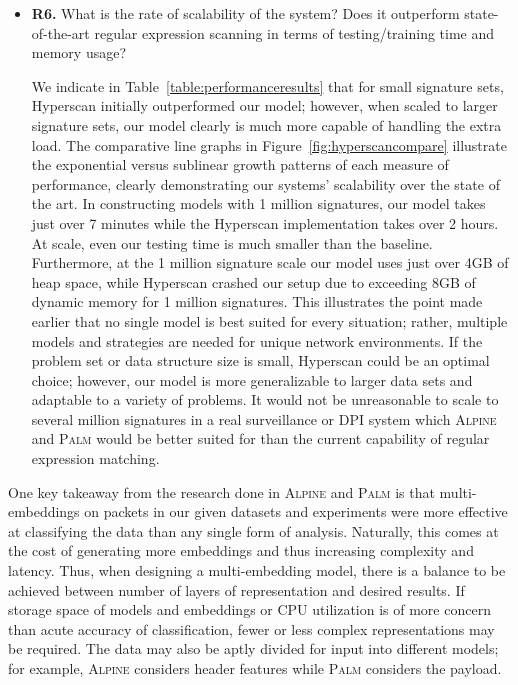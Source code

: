 \begin{itemize}
\item\textbf{R6.} What is the rate of scalability of the system? Does it outperform state-of-the-art regular expression scanning in terms of testing/training time and memory usage?

We indicate in Table~\ref{table:performanceresults} that for small signature sets, Hyperscan initially outperformed our model; however, when scaled to larger signature sets, our model clearly is much more capable of handling the extra load. The comparative line graphs in Figure~\ref{fig:hyperscancompare} illustrate the exponential versus sublinear growth patterns of each measure of performance, clearly demonstrating our systems' scalability over the state of the art. In constructing models with 1 million signatures, our model takes just over 7 minutes while the Hyperscan implementation takes over 2 hours. At scale, even our testing time is much smaller than the baseline. Furthermore, at the 1 million signature scale our model uses just over 4GB of heap space, while Hyperscan crashed our setup due to exceeding 8GB of dynamic memory for 1 million signatures. This illustrates the point made earlier that no single model is best suited for every situation; rather, multiple models and strategies are needed for unique network environments. If the problem set or data structure size is small, Hyperscan could be an optimal choice; however, our model is more generalizable to larger data sets and adaptable to a variety of problems. It would not be unreasonable to scale to several million signatures in a real surveillance or DPI system which \textsc{Alpine} and \textsc{Palm} would be better suited for than the current capability of regular expression matching.
\end{itemize}

One key takeaway from the research done in \textsc{Alpine} and \textsc{Palm} is that multi-embeddings on packets in our given datasets and experiments were more effective at classifying the data than any single form of analysis. Naturally, this comes at the cost of generating more embeddings and thus increasing complexity and latency. Thus, when designing a multi-embedding model, there is a balance to be achieved between number of layers of representation and desired results. If storage space of models and embeddings or CPU utilization is of more concern than acute accuracy of classification, fewer or less complex representations may be required. The data may also be aptly divided for input into different models; for example, \textsc{Alpine} considers header features while \textsc{Palm} considers the payload.

